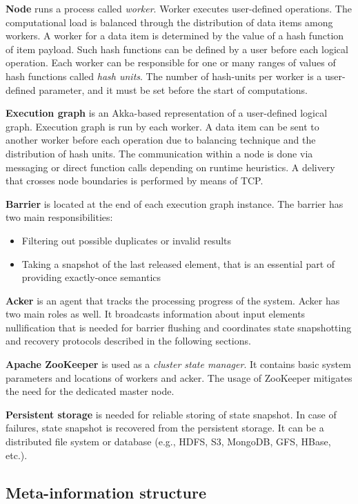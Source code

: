 {\bf Node} runs a process called {\it worker}. Worker executes user-defined operations. The computational load is balanced through the distribution of data items among workers. A worker for a data item is determined by the value of a hash function of item payload. Such hash functions can be defined by a user before each logical operation. Each worker can be responsible for one or many ranges of values of hash functions called {\it hash units}. The number of hash-units per worker is a user-defined parameter, and it must be set before the start of computations. 

{\bf Execution graph} is an Akka-based representation of a user-defined logical graph. Execution graph is run by each worker. A data item can be sent to another worker before each operation due to balancing technique and the distribution of hash units. The communication within a node is done via messaging or direct function calls depending on runtime heuristics. A delivery that crosses node boundaries is performed by means of TCP.

{\bf Barrier} is located at the end of each execution graph instance. The barrier has two main responsibilities:

\begin{itemize}
    \item Filtering out possible duplicates or invalid results
    \item Taking a snapshot of the last released element, that is an essential part of providing exactly-once semantics
\end{itemize}

{\bf Acker} is an agent that tracks the processing progress of the system. Acker has two main roles as well. It broadcasts information about input elements nullification that is needed for barrier flushing and coordinates state snapshotting and recovery protocols described in the following sections.

{\bf Apache ZooKeeper} is used as a {\it cluster state manager}. It contains basic system parameters and locations of workers and acker. The usage of ZooKeeper mitigates the need for the dedicated master node.

{\bf Persistent storage} is needed for reliable storing of state snapshot. In case of failures, state snapshot is recovered from the persistent storage. It can be a distributed file system or database (e.g., HDFS, S3, MongoDB, GFS, HBase, etc.).

\subsection{Meta-information structure}

